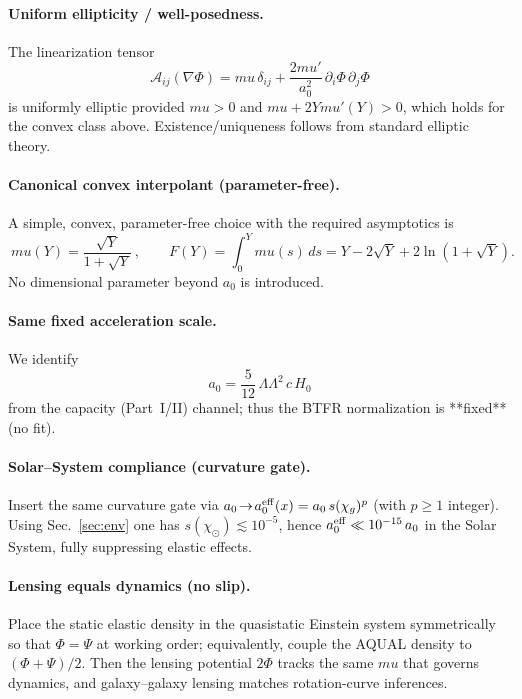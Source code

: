 \documentclass[aps,prd,onecolumn,superscriptaddress,nofootinbib]{revtex4-2}
\def\boxed#1{#1}%
\def\mu{mu}%
\def\Omega_\Lambda{OmegaLambda}%
\begin{document}
\paragraph{Uniform ellipticity / well-posedness.}
The linearization tensor
\[
\mathcal A_{ij}(\nabla\Phi)=\mu\,\delta_{ij}+\frac{2\mu'}{a_0^2}\,\partial_i\Phi\,\partial_j\Phi
\]
is uniformly elliptic provided \(\mu>0\) and \(\mu+2Y\mu'(Y)>0\), which holds for the convex class above. Existence/uniqueness follows from standard elliptic theory.

\paragraph{Canonical convex interpolant (parameter-free).}
A simple, convex, parameter-free choice with the required asymptotics is
\[
\boxed{\ \mu(Y)=\frac{\sqrt{Y}}{1+\sqrt{Y}}\ },\qquad
F(Y)=\int_0^Y \mu(s)\,ds=Y-2\sqrt{Y}+2\ln(1+\sqrt{Y}).
\]
No dimensional parameter beyond \(a_0\) is introduced.

\paragraph{Same fixed acceleration scale.}
We identify
\[
\boxed{\ a_0=\frac{5}{12}\,\Omega_\Lambda^2\,c\,H_0\ }
\]
from the capacity (Part~I/II) channel; thus the BTFR normalization is **fixed** (no fit).

\paragraph{Solar–System compliance (curvature gate).}
Insert the same curvature gate via \(a_0\!\to\! a_0^{\rm eff}(x)=a_0\,s(\chi_g)^p\) (with \(p\ge1\) integer). Using Sec.~\ref{sec:env} one has \(s(\chi_\odot)\lesssim 10^{-5}\), hence \(a_0^{\rm eff}\ll 10^{-15}\,a_0\) in the Solar System, fully suppressing elastic effects.

\paragraph{Lensing equals dynamics (no slip).}
Place the static elastic density in the quasistatic Einstein system symmetrically so that \(\Phi=\Psi\) at working order; equivalently, couple the AQUAL density to \((\Phi+\Psi)/2\). Then the lensing potential \(2\Phi\) tracks the same \(\mu\) that governs dynamics, and galaxy–galaxy lensing matches rotation-curve inferences.

\end{document}
